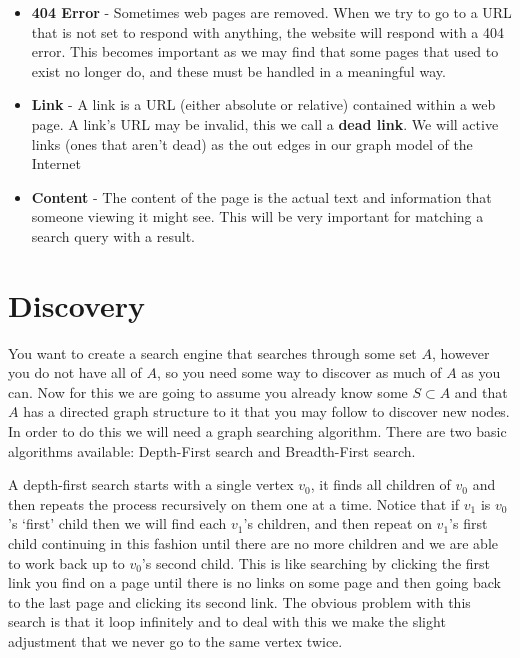 \documentclass{article}
\begin{document}
\begin{itemize}
		\item \textbf{404 Error} - Sometimes web pages are removed. When we try to go to a URL that is not set to respond with anything, the website will respond with a 404 error. This becomes important as we may find that some pages that used to exist no longer do, and these must be handled in a meaningful way.
		
		
		\item \textbf{Link} - A link is a URL (either absolute or relative) contained within a web page. A link's URL may be invalid, this we call a \textbf{dead link}. We will active links (ones that aren't dead) as the out edges in our graph model of the Internet
		
		\item \textbf{Content} - The content of the page is the actual text and information that someone viewing it might see. This will be very important for matching a search query with a result.
		
	\end{itemize}
	
	
	
	\section{Discovery}
	
	You want to create a search engine that searches through some set $A$, however you do not have all of $A$, so you need some way to discover as much of $A$ as you can. Now for this we are going to assume you already know some $S\subset A$ and that $A$ has a directed graph structure to it that you may follow to discover new nodes. In order to do this we will need a graph searching algorithm. There are two basic algorithms available: Depth-First search and Breadth-First search. 
	
	A depth-first search starts with a single vertex $v_0$, it finds all children of $v_0$ and then repeats the process recursively on them one at a time. Notice that if $v_1$ is $v_0$'s `first' child then we will find each $v_1$'s children, and then repeat on $v_1$'s first child continuing in this fashion until there are no more children and we are able to work back up to $v_0$'s second child. This is like searching by clicking the first link you find on a page until there is no links on some page and then going back to the last page and clicking its second link. The obvious problem with this search is that it loop infinitely and to deal with this we make the slight adjustment that we never go to the same vertex twice. 
	
\end{document}
